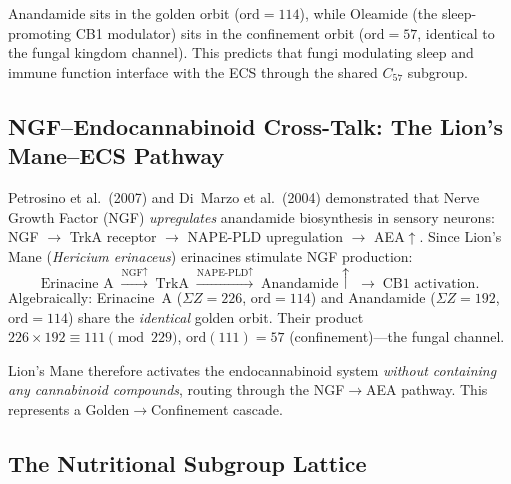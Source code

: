 Anandamide sits in the golden orbit ($\mathrm{ord} = 114$), while Oleamide
(the sleep-promoting CB1 modulator) sits in the confinement orbit
($\mathrm{ord} = 57$, identical to the fungal kingdom channel). This predicts
that fungi modulating sleep and immune function interface with the ECS through
the shared $C_{57}$ subgroup.

\subsection{NGF--Endocannabinoid Cross-Talk: The Lion's Mane--ECS Pathway}

\begin{result}
\label{res:ngf_ecs}
Petrosino et al.\ (2007) and Di~Marzo et al.\ (2004) demonstrated that
Nerve Growth Factor (NGF) \emph{upregulates} anandamide biosynthesis in
sensory neurons: NGF $\to$ TrkA receptor $\to$ NAPE-PLD upregulation $\to$
AEA$\uparrow$. Since Lion's Mane (\emph{Hericium erinaceus}) erinacines
stimulate NGF production:
\begin{equation}
  \text{Erinacine A} \;\xrightarrow{\text{NGF}\uparrow}\;
  \text{TrkA} \;\xrightarrow{\text{NAPE-PLD}\uparrow}\;
  \text{Anandamide}\uparrow \;\to\; \text{CB1 activation}.
\end{equation}
Algebraically: Erinacine~A ($\Sigma Z = 226$, $\mathrm{ord} = 114$) and
Anandamide ($\Sigma Z = 192$, $\mathrm{ord} = 114$) share the \emph{identical}
golden orbit. Their product $226 \times 192 \equiv 111 \pmod{229}$,
$\mathrm{ord}(111) = 57$ (confinement)---the fungal channel.

Lion's Mane therefore activates the endocannabinoid system \emph{without
containing any cannabinoid compounds}, routing through the
NGF$\to$AEA pathway. This represents a Golden$\to$Confinement cascade.
\end{result}

\subsection{The Nutritional Subgroup Lattice}

